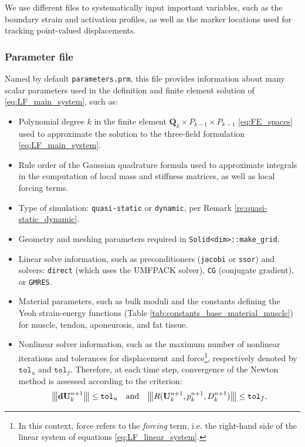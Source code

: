\documentclass{sfuthesis}
\numberwithin{equation}{section}
\numberwithin{figure}{chapter}
\numberwithin{table}{chapter}
\theoremstyle{definition}
\def\*#1{{\mathbf{#1}}} %
\newcommand{\vertiii}[1]{{\left\vert\kern-0.25ex\left\vert\kern-0.25ex\left\vert #1 
    \right\vert\kern-0.25ex\right\vert\kern-0.25ex\right\vert}}
\begin{document}
We use different files to systematically input important variables, such as the boundary strain and activation profiles, as well as the marker locations used for tracking point-valued displacements.

\subsubsection{Parameter file}

Named by default \texttt{parameters.prm}, this file provides information about many scalar parameters used in the definition and finite element solution of \eqref{eq:LF_main_system}, such as:
\begin{itemize}
    \item Polynomial degree $k$ in the finite element $\*Q_{k} \times P_{k-1} \times P_{k-1}$ \eqref{eq:FE_spaces} used to approximate the solution to the three-field formulation \eqref{eq:LF_main_system}.
    \item Rule order of the Gaussian quadrature formula used to approximate integrals in the computation of local mass and stiffness matrices, as well as local forcing terms.
    \item Type of simulation: \texttt{quasi-static} or \texttt{dynamic}, per Remark \ref{re:quasi-static_dynamic}.
    \item Geometry and meshing parameters required in \texttt{Solid<dim>::make\_grid}.
    \item Linear solve information, such as preconditioners (\texttt{jacobi} or \texttt{ssor}) and solvers: \texttt{direct} (which uses the UMFPACK solver), \texttt{CG} (conjugate gradient), or \texttt{GMRES}.
    \item Material parameters, such as bulk moduli and the constants defining the Yeoh strain-energy functions (Table \ref{tab:constants_base_material_muscle}) for muscle, tendon, aponeurosis, and fat tissue.
    \item Nonlinear solver information, such as the maximum number of nonlinear iterations and tolerances for displacement and force\footnote{In this context, force refers to the \textit{forcing} term, i.e. the right-hand side of the linear system of equations \eqref{eq:LF_linear_system}.}, respectively denoted by $\mathtt{tol}_u$ and $\mathtt{tol}_f$. Therefore, at each time step, convergence of the Newton method is assessed according to the criterion:
    \[
        \vertiii{\*d \*U_k^{n+1}} \leq \mathtt{tol}_u \quad \text{and} \quad \vertiii{R(\*U_k^{n+1}, p_k^{n+1}, D_k^{n+1})} \leq \mathtt{tol}_f,
\]
\end{itemize}
\end{document}

